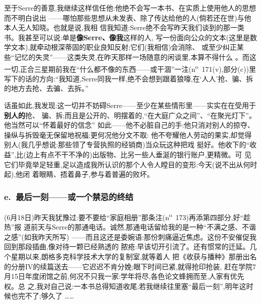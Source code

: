 至于Serre的善意,我继续这样信任他:他绝不会写一本书、在实质上使用他人的思想而不明白说出
——哪怕那些思想从未发表、除了传达给他的人(倘若还在世)与他本人无人知晓。也就是说,我相
信我知道:Serre绝不会写昨天我们谈到的那一类书。我甚至可以说:单是\textbf{像Serre、像我}这样的人,
写一份面向公众的文本(这里是数学文本),就牵动根深蒂固的职业良知反射;它们(我相信)会消除、
或至少纠正某些“记忆的失灵”——这类失灵,在昨天那样一场随意的闲谈里,本算不得什么
。而这一切,正合三星期前\dmark{}我在“什么都不像的东西——或干涸”一注(n\textsuperscript{o}~171(v),部分(c))里写下的话的方向:“我知道,Serre同我一样,绝不会想到跟着狼嚎,在‘人人’抢、骗、拆的地方去抢、去骗、去拆。”

话虽如此,我发现:这一切并不妨碍Serre——至少在某些情形里——实实在在受用于\textbf{别人的}抢、
骗、拆;而且是公开的、明摆着的,“在大庭广众之间”、“在聚光灯下”。他当然可以“怀着最好的信念”
如此——他不必脏自己的手:他只消对别人的掠夺、操纵与拆毁毫无保留地祝福;更何况他分文不取:
他不夸耀他人劳动的果实,却觉得别人(我几乎想说:那些领了专营执照的经销商)当众玩这种把戏
挺好。他收下的“收益”,比(边上有点不干不净的)出版物、比另一些人垂涎的银行账户,更精微。可
见它们毕竟举足轻重,足以造成我所认识的那个人令人瞠目的变形:今天(说不出从何时起),他闭
着眼睛、捂着鼻子,参与着普遍的败坏。

\subsubsection*{e.\ 最后一刻——或一个禁忌的终结}

(6月18日)昨天我犹豫过:要不要给“家庭相册”那条注(n\textsuperscript{o}~173)再添第四部分,好“趁热”报
道前天与Serre的那通电话。诚然,那通电话留给我的是一种“不满之感、不谐之感”(如我昨天所写)
——而且这还是委婉语:那份刺痛逼近焦虑。这份不安催促我回到那段插曲,像对待一颗已经熟透的
脓疮:早该切开引流了\dmark{}。还有惯常的迁延。几个星期以来,朗格多克科学技术大学的复制室,就等着人
把《收获与播种》那册出名的分册IV的续篇送去——它迟迟不肯分娩;眼下时间已紧,就得抢印抢装,
赶在学院7月15日年度闭馆之前,何况不只我一家:学年将尽,各色论文蜂拥而至,人家有优先权。总
之,我对自己说:一本书总得知道收尾;若我继续往里塞“最后一刻”,明年这时候也完不了;够久了
……

